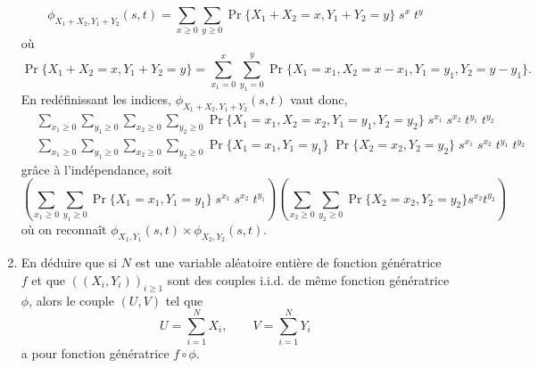 \begin{enumerate}
{  $$
  \phi_{X_1+X_2, Y_1+Y_2}(s, t)
  =
  \sum_{x \geq 0} \sum_{y \geq 0} \Pr\{X_1+X_2=x, Y_1+Y_2=y\} \; s^x \; t^y
  $$
  où
  $$
  \Pr\{X_1+X_2=x, Y_1+Y_2=y\} 
  =
  \sum_{x_1=0}^x \sum_{y_1=0}^y \Pr\{X_1=x_1, X_2=x-x_1, Y_1=y_1, Y_2=y-y_1\}.
  $$
  En redéfinissant les indices, $\phi_{X_1+X_2, Y_1+Y_2}(s, t)$ vaut donc, 
  \begin{align*}
  & \sum_{x_1 \geq 0} \sum_{y_1 \geq 0} \sum_{x_2 \geq 0} \sum_{y_2 \geq 0} \Pr\{X_1=x_1, X_2=x_2, Y_1=y_1, Y_2=y_2\} \; s^{x_1} \; s^{x_2} \; t^{y_1} \; t^{y_2} \\ 
  & \sum_{x_1 \geq 0} \sum_{y_1 \geq 0} \sum_{x_2 \geq 0} \sum_{y_2 \geq 0} \Pr\{X_1=x_1, Y_1=y_1\} \; \Pr\{X_2=x_2, Y_2=y_2\} \; s^{x_1} \; s^{x_2} \; t^{y_1} \; t^{y_2} 
  \end{align*}
  grâce à l'indépendance, soit
  $$
  \left(\sum_{x_1 \geq 0} \sum_{y_1 \geq 0}\Pr\{X_1=x_1, Y_1=y_1\} \; s^{x_1} \; s^{x_2} \; t^{y_1}\right) \left(\sum_{x_2 \geq 0} \sum_{y_2 \geq 0} \Pr\{X_2=x_2, Y_2=y_2\} s^{x_2} t^{y_2}\right)
  $$
  où on reconnaît $\phi_{X_1, Y_1}(s, t) \times \phi_{X_2, Y_2}(s, t)$.
  }   
  \item En déduire que si $N$ est une variable aléatoire entière de fonction génératrice $f$ et que $((X_i, Y_i))_{i \geq 1}$ sont des couples i.i.d. de même fonction génératrice $\phi$, alors le couple $(U, V)$ tel que
  $$
  U = \sum_{i=1}^N X_i, \qquad V = \sum_{i=1}^N Y_i
  $$
  a pour fonction génératrice $f \circ \phi$.
  \solution{\todo{}}   
\end{enumerate}


